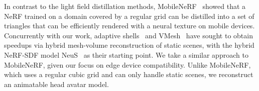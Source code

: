 In contrast to the light field distillation methods, MobileNeRF~\cite{chen2023mobilenerf} showed that a NeRF trained on a domain covered by a regular grid can be distilled into a set of triangles that can be efficiently rendered with a neural texture on mobile devices. 
Concurrently with our work, adaptive shells~\cite{wang2023adaptive} and VMesh~\cite{guo2023vmesh} have sought to obtain speedups via hybrid mesh-volume reconstruction of static scenes, with the hybrid NeRF-SDF model NeuS~\cite{wang2021neus} as their starting point.
We take a similar approach to MobileNeRF, given our focus on edge device compatibility. Unlike MobileNeRF, which uses a regular cubic grid and can only handle static scenes, we reconstruct an animatable head avatar model.
